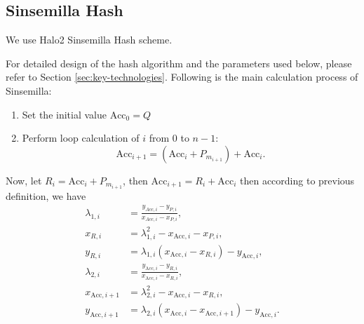 \subsection{Sinsemilla Hash}

We use Halo2 \cite{website:halo2} Sinsemilla Hash scheme.

For detailed design of the hash algorithm and the parameters used below, please refer to Section \ref{sec:key-technologies}.
Following is the main calculation process of Sinsemilla:
\begin{enumerate}
    \item Set the initial value $\mathrm{Acc}_0 = Q$
    \item Perform loop calculation of $i$ from $0$ to $n-1$:
    \[ \mathrm{Acc}_{i+1} = (\mathrm{Acc}_i + P_{m_{i+1}}) + \mathrm{Acc}_i. \]
\end{enumerate}

Now, let $R_i = \mathrm{Acc}_i + P_{m_{i+1}}$, then $\mathrm{Acc}_{i+1} = R_i + \mathrm{Acc}_i$ then according to previous definition, we have
\begin{align*}
\lambda_{1,i} &= \frac {y_{Acc,i} - y_{P,i}}{x_{Acc,i}-x_{P,i}}, \\
x_{R,i} &= \lambda_{1,i}^2 - x_{\text{Acc},i}-x_{P,i}, \\
y_{R,i} &= \lambda_{1,i} (x_{\text{Acc},i} - x_{R,i}) - y_{\text{Acc},i}, \\
\lambda_{2,i} &= \frac {y_{\text{Acc},i} - y_{R,i}}{x_{\text{Acc},i}-x_{R,i}}, \\
x_{\text{Acc},i+1} &= \lambda_{2,i}^2 - x_{\text{Acc},i}-x_{R,i}, \\
y_{\text{Acc},i+1} &= \lambda_{2,i} (x_{\text{Acc},i} - x_{\text{Acc},i+1}) - y_{\text{Acc},i}.
\end{align*}

